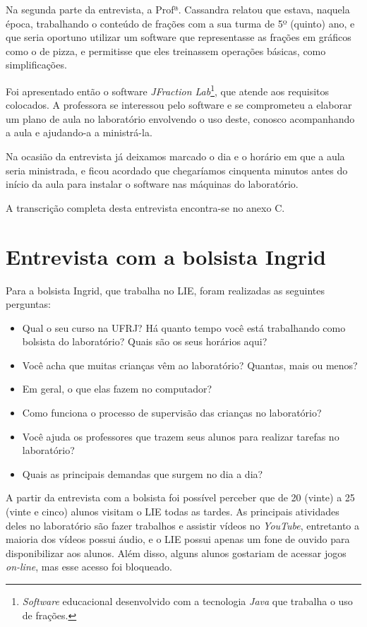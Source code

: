 Na segunda parte da entrevista, a Profª. Cassandra relatou que estava, naquela época, trabalhando o conteúdo de frações com a sua turma de 5º (quinto) ano, e que seria oportuno utilizar um software que representasse as frações em gráficos como o de pizza, e permitisse que eles treinassem operações básicas, como simplificações. 

Foi apresentado então o software \textit{JFraction Lab}\footnote{\textit{Software} educacional desenvolvido com a tecnologia \textit{Java} que trabalha o uso de frações.}, que atende aos requisitos colocados. A professora se interessou pelo software e se comprometeu a elaborar um plano de aula no laboratório envolvendo o uso deste, conosco acompanhando a aula e ajudando-a a ministrá-la.

Na ocasião da entrevista já deixamos marcado o dia e o horário em que a aula seria ministrada, e ficou acordado que chegaríamos cinquenta minutos antes do início da aula para instalar o software nas máquinas do laboratório.

A transcrição completa desta entrevista encontra-se no anexo C.

\section{Entrevista com a bolsista Ingrid}\label{chp:LABEL_CHP_ENT_SEC_ING}

Para a bolsista Ingrid, que trabalha no LIE, foram realizadas as seguintes perguntas:

\begin{itemize}
\item{Qual o seu curso na UFRJ? Há quanto tempo você está trabalhando como bolsista do laboratório? Quais são os seus horários aqui?}
\item{Você acha que muitas crianças vêm ao laboratório? Quantas, mais ou menos?}
\item{Em geral, o que elas fazem no computador?}
\item{Como funciona o processo de supervisão das crianças no laboratório?}
\item{Você ajuda os professores que trazem seus alunos para realizar tarefas no laboratório?}
\item{Quais as principais demandas que surgem no dia a dia?}
\end{itemize}

A partir da entrevista com a bolsista foi possível perceber que de 20 (vinte) a 25 (vinte e cinco) alunos visitam o LIE todas as tardes. As principais atividades deles no laboratório são fazer trabalhos e assistir vídeos no \textit{YouTube}, entretanto a maioria dos vídeos possui áudio, e o LIE possui apenas um fone de ouvido para disponibilizar aos alunos. Além disso, alguns alunos gostariam de acessar jogos \textit{on-line}, mas esse acesso foi bloqueado.

